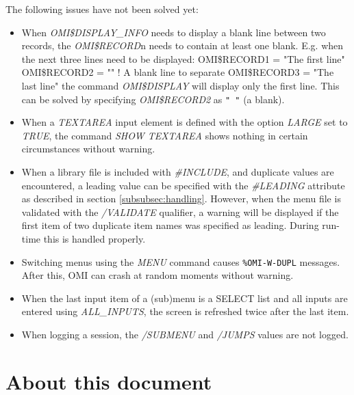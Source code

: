 \documentclass[a4paper]{book}
\renewcommand{\indent}{\hspace*{5mm}}
\begin{document}
The following issues have not been solved yet: \\
\begin{itemize}
\item When \textsl{OMI{\$}DISPLAY{\_}INFO} needs to display a blank line between two 
records, the \textsl{OMI{\$}RECORD}n needs to contain at least one blank. \newline
E.g. when the next three lines need to be displayed:\newline
\indent\textsf{OMI{\$}RECORD1 = "The first line"} \newline
\indent\textsf{OMI{\$}RECORD2 = "" ! A blank line to separate} \newline
\indent\textsf{OMI{\$}RECORD3 = "The last line"} \newline
the command \textsl{OMI{\$}DISPLAY} will display only the first line. This can be 
solved by specifying \textsl{OMI{\$}RECORD2} as \verb*|" "| (a blank).
\item When a \textsl{TEXTAREA} input element is defined with the option \textsl{LARGE} set to \textsl{TRUE}, 
the command \textsl{SHOW TEXTAREA} shows nothing in certain circumstances without 
warning.
\item When a library file is included with \textsl{{\#}INCLUDE}, and duplicate values are 
encountered, a leading value can be specified with the \textsl{{\#}LEADING} attribute 
as described in section \ref{subsubsec:handling}. However, when the 
menu file is validated with the \textsl{/VALIDATE} qualifier, a warning will be 
displayed if the first item of two duplicate item names was specified as 
leading. During run-time this is handled properly.
\item Switching menus using the \textsl{MENU} command causes \texttt{\%OMI-W-DUPL}
messages. After this, OMI can crash at random moments without warning.
\item When the last input item of a (sub)menu is a SELECT list and all inputs are entered
using \textsl{ALL{\_}INPUTS}, the screen is refreshed twice after the last item.
\item When logging a session, the \textsl{/SUBMENU} and \textsl{/JUMPS} values are not logged.
\end{itemize}

\section*{About this document}
\end{document}
